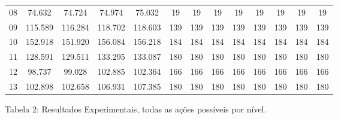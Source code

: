 \documentclass[12pt,a4paper]{article}
\begin{document}
\begin{adjustbox}{width={\textwidth}, totalheight={\textheight}, keepaspectratio}
\begin{tabular}{l cccc cccc cccc}
            08    & 74.632                                     & 74.724                          & 74.974                             & 75.032     & 19  & 19   & 19  & 19         & 19  & 19   & 19  & 19         \\
            09    & 115.589                                    & 116.284                         & 118.702                            & 118.603    & 139 & 139  & 139 & 139        & 139 & 139  & 139 & 139        \\
            10    & 152.918                                    & 151.920                         & 156.084                            & 156.218    & 184 & 184  & 184 & 184        & 184 & 184  & 184 & 184        \\
            11    & 128.591                                    & 129.511                         & 133.295                            & 133.087    & 180 & 180  & 180 & 180        & 180 & 180  & 180 & 180        \\
            12    & 98.737                                     & 99.028                          & 102.885                            & 102.364    & 166 & 166  & 166 & 166        & 166 & 166  & 166 & 166        \\
            13    & 102.898                                    & 102.658                         & 106.931                            & 107.385    & 180 & 180  & 180 & 180        & 180 & 180  & 180 & 180        \\
            \bottomrule
      \end{tabular}
\end{adjustbox}

\vspace*{0.5cm}

\begin{center}
      Tabela 2: Resultados Experimentais, todas as ações possíveis por nível.
\end{center}

\vspace*{1cm}
\end{document}
